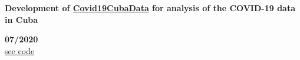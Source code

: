 \begin{minipage}{0.8\textwidth}
    \parbox{0.8\linewidth}{\textbf{Development of \hyperref[sec:covid]{Covid19CubaData} for analysis of the COVID-19 data in Cuba}} \hfill \textbf{07/2020}\\
    \href{https://github.com/covid19cuba/covid19cuba-action}{see code}\\
    \end{minipage} \hfill {}\\\\
    